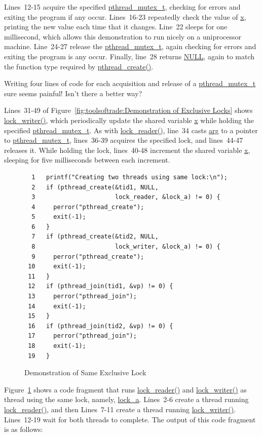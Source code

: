 Lines~12-15 acquire the specified \url{pthread_mutex_t}, checking
for errors and exiting the program if any occur.
Lines~16-23 repeatedly check the value of \url{x}, printing the new value
each time that it changes.
Line~22 sleeps for one millisecond, which allows this demonstration
to run nicely on a uniprocessor machine.
Line~24-27 release the \url{pthread_mutex_t}, again checking for
errors and exiting the program is any occur.
Finally, line~28 returns \url{NULL}, again to match the function type
required by \url{pthread_create()}.

\QuickQuiz{}
	Writing four lines of code for each acquisition and release
	of a \url{pthread_mutex_t} sure seems painful!
	Isn't there a better way?
 \QuickQuizEnd

Lines~31-49 of
Figure~\ref{fig:toolsoftrade:Demonstration of Exclusive Locks}
shows \url{lock_writer()}, which
periodically update the shared variable \url{x} while holding the
specified \url{pthread_mutex_t}.
As with \url{lock_reader()}, line~34 casts \url{arg} to a pointer
to \url{pthread_mutex_t}, lines~36-39 acquires the specified lock,
and lines~44-47 releases it.
While holding the lock, lines~40-48 increment the shared variable \url{x},
sleeping for five milliseconds between each increment.

\begin{figure}[tbp]
{ \scriptsize
\begin{verbatim}
  1   printf("Creating two threads using same lock:\n");
  2   if (pthread_create(&tid1, NULL,
  3                      lock_reader, &lock_a) != 0) {
  4     perror("pthread_create");
  5     exit(-1);
  6   }
  7   if (pthread_create(&tid2, NULL,
  8                      lock_writer, &lock_a) != 0) {
  9     perror("pthread_create");
 10     exit(-1);
 11   }
 12   if (pthread_join(tid1, &vp) != 0) {
 13     perror("pthread_join");
 14     exit(-1);
 15   }
 16   if (pthread_join(tid2, &vp) != 0) {
 17     perror("pthread_join");
 18     exit(-1);
 19   }
\end{verbatim}
}
\caption{Demonstration of Same Exclusive Lock}
\label{fig:toolsoftrade:Demonstration of Same Exclusive Lock}
\end{figure}

Figure~\ref{fig:toolsoftrade:Demonstration of Same Exclusive Lock}
shows a code fragment that runs \url{lock_reader()} and
\url{lock_writer()} as thread using the same lock, namely, \url{lock_a}.
Lines~2-6 create a thread running \url{lock_reader()}, and then
Lines~7-11 create a thread running \url{lock_writer()}.
Lines~12-19 wait for both threads to complete.
The output of this code fragment is as follows:

